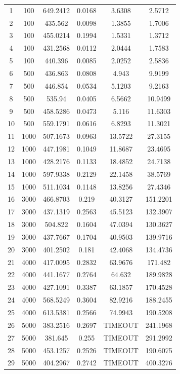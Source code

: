 \begin{table}[htb]
\begin{tabular}{c|c|c|c|c|c}
1 & 100 & 649.2412 & 0.0168 & 3.6308 & 2.5712\\
2 & 100 & 435.562 & 0.0098 & 1.3855 & 1.7006\\
3 & 100 & 455.0214 & 0.1994 & 1.5331 & 1.3712\\
4 & 100 & 431.2568 & 0.0112 & 2.0444 & 1.7583\\
5 & 100 & 440.396 & 0.0085 & 2.0252 & 2.5836\\
6 & 500 & 436.863 & 0.0808 & 4.943 & 9.9199\\
7 & 500 & 446.854 & 0.0534 & 5.1203 & 9.2163\\
8 & 500 & 535.94 & 0.0405 & 6.5662 & 10.9499\\
9 & 500 & 458.5286 & 0.0473 & 5.116 & 11.6303\\
10 & 500 & 559.1791 & 0.0616 & 6.8293 & 11.3021\\
11 & 1000 & 507.1673 & 0.0963 & 13.5722 & 27.3155\\
12 & 1000 & 447.1981 & 0.1049 & 11.8687 & 23.4695\\
13 & 1000 & 428.2176 & 0.1133 & 18.4852 & 24.7138\\
14 & 1000 & 597.9338 & 0.2129 & 22.1458 & 38.5769\\
15 & 1000 & 511.1034 & 0.1148 & 13.8256 & 27.4346\\
16 & 3000 & 466.8703  & 0.219 & 40.3127 & 151.2201\\
17 & 3000 & 437.1319 & 0.2563 & 45.5123 & 132.3907\\
18 & 3000 & 504.822 & 0.1604 & 47.0394 & 130.3627\\
19 & 3000 & 437.7667 & 0.1704 & 40.9503 & 139.9716\\
20 & 3000 & 401.2502 & 0.181 & 42.4068 & 134.4736\\
21 & 4000 & 417.0095 & 0.2832 & 63.9676 & 171.482\\
22 & 4000 & 441.1677 & 0.2764 & 64.632 & 189.9828\\
23 & 4000 & 427.1091 & 0.3387 & 63.1857 & 170.4528\\
24 & 4000 & 568.5249 & 0.3604 & 82.9216 & 188.2455\\
25 & 4000 & 613.5381 & 0.2566 & 74.9943 & 190.5208\\
26 & 5000 & 383.2516 & 0.2697 & TIMEOUT & 241.1968\\
27 & 5000 & 381.645 & 0.255 & TIMEOUT & 291.2992\\
28 & 5000 & 453.1257 & 0.2526 & TIMEOUT & 190.6075\\
29 & 5000 & 404.2967 & 0.2742 & TIMEOUT & 400.3276\\

\end{tabular}
\end{table}
